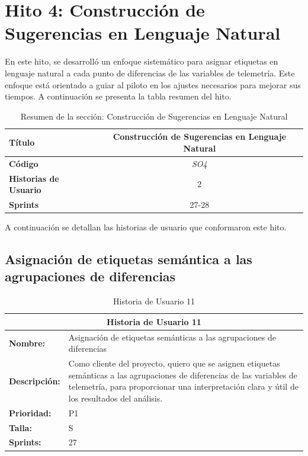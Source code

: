 \newpage

\section{Hito 4: Construcción de Sugerencias en Lenguaje Natural}

En este hito, se desarrolló un enfoque sistemático para asignar etiquetas en lenguaje natural a cada punto de diferencias de las variables de telemetría. Este enfoque está orientado a guiar al piloto en los ajustes necesarios para mejorar sus tiempos. A continuación se presenta la tabla resumen del hito.

\begin{table}[H]
\centering
\begin{tabular}{|l|c|}
\hline
\textbf{Título} & Construcción de Sugerencias en Lenguaje Natural \\ \hline
\textbf{Código} & \textit{SO4} \\ \hline
\textbf{Historias de Usuario} & 2 \\ \hline
\textbf{Sprints} & 27-28 \\ \hline
\end{tabular}
\caption{Resumen de la sección: Construcción de Sugerencias en Lenguaje Natural}
\label{tab:resumen_so4}
\end{table}

A continuación se detallan las historias de usuario que conformaron este hito.

\subsection{Asignación de etiquetas semántica a las agrupaciones de diferencias}
\begin{table}[H]
\centering
\begin{tabular}{|l|p{10cm}|}
\hline
\multicolumn{2}{|c|}{\textbf{Historia de Usuario 11}} \\ \hline
\textbf{Nombre:} & Asignación de etiquetas semánticas a las agrupaciones de diferencias \\ \hline
\textbf{Descripción:} & Como cliente del proyecto, quiero que se asignen etiquetas semánticas a las agrupaciones de diferencias de las variables de telemetría, para proporcionar una interpretación clara y útil de los resultados del análisis. \\ \hline
\textbf{Prioridad:} & P1 \\ \hline
\textbf{Talla:} & S \\ \hline
\textbf{Sprints:} & 27 \\ \hline
\end{tabular}
\caption{Historia de Usuario 11}
\label{tab:asignacion_semanitca_agrupaciones}
\end{table}

